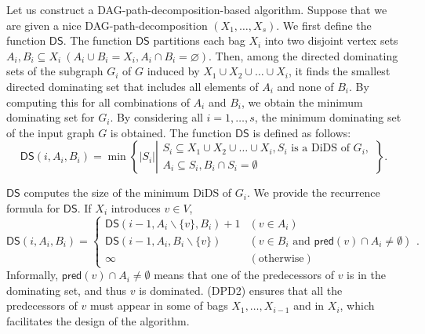 \documentclass[runningheads]{llncs}
\theoremstyle{plain}
\theoremstyle{definition}
\begin{document}
Let us construct a DAG-path-decomposition-based algorithm. Suppose that we are given a nice DAG-path-decomposition $(X_1,\ldots,X_s)$. We first define the function $\mathsf{DS}$. The function $\mathsf{DS}$ partitions each bag $X_i$ into two disjoint vertex sets $A_i, B_i \subseteq X_i ~(A_i \cup B_i = X_i, A_i \cap B_i = \varnothing)$. Then, among the directed dominating sets of the subgraph $G_i$ of $G$ induced by $X_1 \cup X_2 \cup \dots \cup X_i$, it finds the smallest directed dominating set that includes all elements of $A_i$ and none of $B_i$. By computing this for all combinations of $A_i$ and $B_i$, we obtain the minimum dominating set for $G_i$. By considering all $i = 1,\ldots,s$, the minimum dominating set of the input graph $G$ is obtained. The function $\mathsf{DS}$ is defined as follows:
    \begin{equation}\label{def_ds}
        \mathsf{DS}(i, A_i, B_i) = \min \left\{ |S_i| \left |
        \begin{array}{l}
                S_i \subseteq X_1 \cup X_2 \cup  \dots \cup X_i, S_i \text{ is a DiDS of } G_i, \\
                A_i \subseteq S_i, B_i \cap S_i = \emptyset
        \end{array}
        \right. \right\}.
    \end{equation}

$\mathsf{DS}$ computes the size of the minimum DiDS of $G_i$. We provide the recurrence formula for $\mathsf{DS}$. If $X_i$ introduces $v \in V$,
%
\begin{equation*}
    \mathsf{DS}(i, A_i, B_i) = 
    \begin{cases}
        \mathsf{DS}(i-1, A_i \backslash \{v\}, B_i) + 1 & (v \in A_i) \\
        \mathsf{DS}(i-1, A_i, B_i \backslash \{v\}) & (v \in B_i \text{ and } \mathsf{pred}(v) \cap A_i \neq \emptyset) \\
        \infty & (\text{otherwise})
    \end{cases}.
\end{equation*}
%
Informally, $\mathsf{pred}(v) \cap A_i \neq \emptyset$ means that one of the predecessors of $v$ is in the dominating set, and thus $v$ is dominated. (DPD2) ensures that all the predecessors of $v$ must appear in some of bags $X_1,\ldots,X_{i-1}$ and in $X_i$, which facilitates the design of the algorithm.
\end{document}
